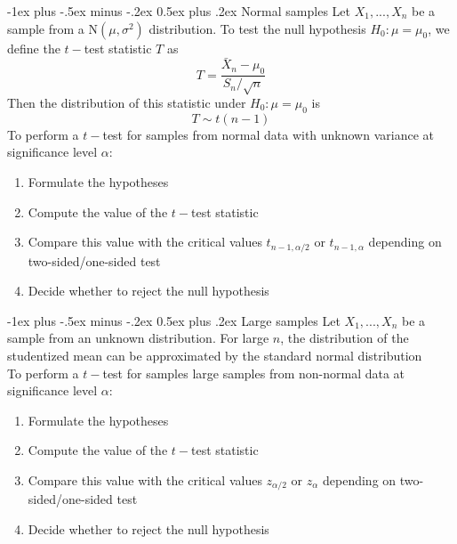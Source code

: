 \documentclass[10pt,landscape,a4paper]{article}
\makeatletter
\renewcommand{\section}{\@startsection{section}{1}{0mm}%
	{-1ex plus -.5ex minus -.2ex}%
	{0.5ex plus .2ex}%
	{\normalfont\large\bfseries}}
\makeatother
\begin{document}
\begin{multicols}{3}
	\section{Normal samples}
	Let $X_1,...,X_n$ be a sample from a $\mathrm{N}(\mu, \sigma^2)$ distribution.
	To test the null hypothesis $H_0: \mu = \mu_0$, we define the $t-$test
	statistic $T$ as
	\begin{equation*}
		T=\frac{\bar{X}_n - \mu_0}{S_n / \sqrt{n}}
	\end{equation*}
	Then the distribution of this statistic under $H_0: \mu = \mu_0$ is
	\begin{equation*}
		T \sim t(n-1)
	\end{equation*}
	To perform a $t-$test for samples from normal data with unknown variance
	at significance level $\alpha$:
	\begin{enumerate}
		\item Formulate the hypotheses
		\item Compute the value of the $t-$test statistic
		\item Compare this value with the critical values $t_{n-1,\alpha/2}$ or
		      $t_{n-1,\alpha}$ depending on two-sided/one-sided test
		\item Decide whether to reject the null hypothesis
	\end{enumerate}
	
	\section{Large samples}
	Let $X_1,...,X_n$ be a sample from an unknown distribution. For large $n$, the
	distribution of the studentized mean can be approximated by the standard
	normal distribution \\
	To perform a $t-$test for samples large samples from non-normal data
	at significance level $\alpha$:
	\begin{enumerate}
		\item Formulate the hypotheses
		\item Compute the value of the $t-$test statistic
		\item Compare this value with the critical values $z_{\alpha/2}$ or
		      $z_{\alpha}$ depending on two-sided/one-sided test
		\item Decide whether to reject the null hypothesis
	\end{enumerate}
	
\end{multicols}
\end{document}
